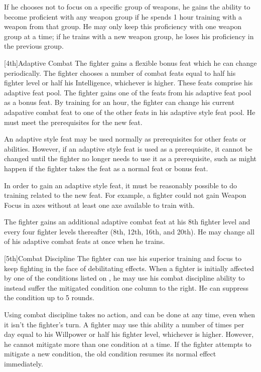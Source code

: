 If he chooses not to focus on a specific group of weapons, he gains the ability to become proficient with any weapon group if he spends 1 hour training with a weapon from that group.
He may only keep this proficiency with one weapon group at a time; if he trains with a new weapon group, he loses his proficiency in the previous group.

[4th]{Adaptive Combat}
The fighter gains a flexible bonus feat which he can change periodically.
The fighter chooses a number of combat feats equal to half his fighter level or half his Intelligence, whichever is higher.
These feats comprise his adaptive feat pool.
The fighter gains one of the feats from his adaptive feat pool as a bonus feat.
By training for an hour, the fighter can change his current adapative combat feat to one of the other feats in his adaptive style feat pool.
He must meet the prerequisites for the new feat.

\par An adaptive style feat may be used normally as prerequisites for other feats or abilities.
However, if an adaptive style feat is used as a prerequisite, it cannot be changed until the fighter no longer needs to use it as a prerequisite, such as might happen if the fighter takes the feat as a normal feat or bonus feat.

\par In order to gain an adaptive style feat, it must be reasonably possible to do training related to the new feat.
For example, a fighter could not gain Weapon Focus in axes without at least one axe available to train with.

The fighter gains an additional adaptive combat feat at his 8th fighter level and every four fighter levels thereafter (8th, 12th, 16th, and 20th).
He may change all of his adaptive combat feats at once when he trains.

[5th]{Combat Discipline}
The fighter can use his superior training and focus to keep fighting in the face of debilitating effects.
When a fighter is initially affected by one of the conditions listed on , he may use his combat discipline ability to instead suffer the mitigated condition one column to the right.
He can suppress the condition up to 5 rounds.

\par Using combat discipline takes no action, and can be done at any time, even when it isn't the fighter's turn.
A fighter may use this ability a number of times per day equal to his Willpower or half his fighter level, whichever is higher.
However, he cannot mitigate more than one condition at a time.
If the fighter attempts to mitigate a new condition, the old condition resumes its normal effect immediately.

